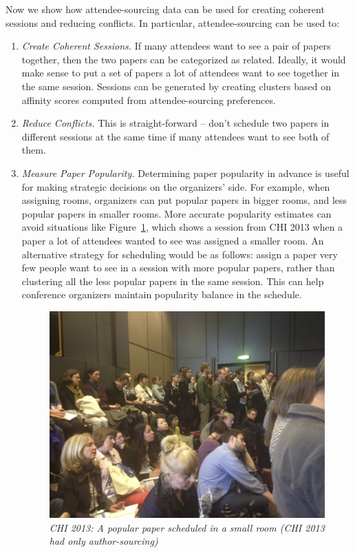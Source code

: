\documentclass[letterpaper]{article}
\begin{document}
Now we show how attendee-sourcing data can be used for creating coherent sessions and reducing conflicts.  In particular, attendee-sourcing can be used to:
\begin{enumerate}
\item \emph{Create Coherent Sessions.} If many attendees want to see a pair of papers together, then the two papers can be categorized as related. Ideally, it would make sense to put a set of papers a lot of attendees want to see together in the same session. Sessions can be generated by creating clusters based on affinity scores computed from attendee-sourcing preferences.

\item \emph{Reduce Conflicts.} This is straight-forward -- don't schedule two papers in different sessions at the same time if many attendees want to see both of them. 

\item \emph{Measure Paper Popularity.} Determining paper popularity in advance is useful for making strategic decisions on the organizers' side. For example, when assigning rooms, organizers can put popular papers in bigger rooms, and less popular papers in smaller rooms. More accurate popularity estimates can avoid situations like Figure~\ref{crowded-room}, which shows a session from CHI 2013 when a paper a lot of attendees wanted to see was assigned a smaller room. An alternative strategy for scheduling would be as follows: assign a paper very few people want to see in a session with more popular papers, rather than clustering all the less popular papers in the same session. This can help conference organizers maintain popularity balance in the schedule.

\begin{figure}[!h]
\centering
\includegraphics[width=0.9\columnwidth]{crowded-room.png}
\caption{\emph{CHI 2013: A popular paper scheduled in a small room (CHI 2013 had only author-sourcing)}}
\label{crowded-room}
\end{figure}
\end{enumerate}
\end{document}

